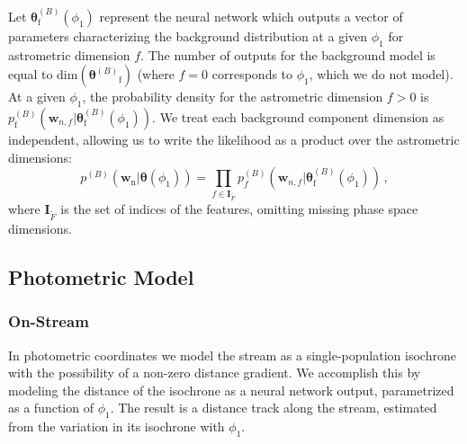 \documentclass[twocolumn]{aastex631}
\newcommand{\mrm}[1]{\mathrm{#1}}
\newcommand{\mbs}[1]{\boldsymbol{#1}}
\newcommand{\pdf}{p}
\newcommand{\nth}[1]{{#1}_{\mrm{n}}}  %
\newcommand{\fth}[1]{{#1}_{\mrm{f}}}  %
\newcommand{\smallcomponent}[2]{#2^{\scriptscriptstyle (#1)}}
\newcommand{\cmp}[2]{\smallcomponent{#1}{#2}}
\newcommand{\Bcmp}[1]{\cmp{B}{#1}}
\begin{document}
            Let $\Bcmp{\fth{\mbs{\theta}}}(\phi_1)$ represent the neural network
            which outputs a vector of parameters characterizing the background
            distribution at a given $\phi_1$ for astrometric dimension $f$. The
            number of outputs for the background model is equal to
            $\mathrm{dim}\left(\fth{\Bcmp{\mbs{\theta}}}\right)$ (where $f=0$
            corresponds to $\phi_1$, which we do not model). At a given
            $\phi_1$, the probability density for the astrometric dimension
            $f>0$ is $\Bcmp{\fth{\pdf}}\left(\mbs{w}_{n,f} |
            \Bcmp{\fth{\mbs{\theta}}}(\phi_1) \right)$. We treat each background
            component dimension as independent, allowing us to write the
            likelihood as a product over the astrometric dimensions:
            \begin{equation} \label{eq:astrometric_model_off_stream_probability}
                \pdf^{(B)}\left(\nth{\mbs{w}} | \mbs{\theta}(\phi_1) \right) = \prod_{f\in \mbs{I}_{\tilde{F}}} \pdf_f^{(B)}\left(\mbs{w}_{n,f} | \Bcmp{\fth{\mbs{\theta}}}(\phi_1) \right)\,,
            \end{equation}
            where $\mbs{I}_{\tilde{F}}$ is the set of indices of the features,
            omitting missing phase space dimensions.
        


    \subsection{Photometric Model} \label{sub:method:photometric_model}

        \subsubsection{On-Stream} \label{ssub:method:photometric_model:on_stream}

            In photometric coordinates we model the stream as a
            single-population isochrone with the possibility of a non-zero
            distance gradient. We accomplish this by modeling the distance of
            the isochrone as a neural network output, parametrized as a function
            of $\phi_1$. The result is a distance track along the stream,
            estimated from the variation in its isochrone with $\phi_1$. 
            
\end{document}
